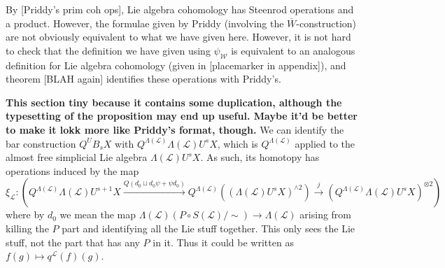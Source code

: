 \documentclass[11pt]{amsart}
\theoremstyle{plain}
\theoremstyle{definition}
\renewcommand{\to}{\longrightarrow}
\newcommand{\scrL}{\mathscr{L}}
\newcommand{\calW}{\mathcal{W}}
\theoremstyle{plain}
\newcommand{\LieOperad}{{\scrL}}
\begin{document}
\begin{Cohomology operations for unstable Lie algebras over P}
By [Priddy's prim coh ops], Lie algebra cohomology has Steenrod operations and a product. However, the formulae given by Priddy (involving the $\overline{W}$-construction) are not obviously equivalent to what we have given here. However, it is not hard to check that the definition we have given using $\psi_\calW$ is equivalent to an analogous definition for Lie algebra cohomology (given in [placemarker in appendix]), and theorem [BLAH again] identifies these operations with Priddy's.

{\tiny
\textbf{This section tiny because it contains some duplication, although the typesetting of the proposition may end up useful. Maybe it'd be better to make it lokk more like Priddy's format, though.} We can identify the bar construction $Q^UB_sX$ with
$Q^{\Lambda(\LieOperad)}\Lambda(\LieOperad)U^sX$,
which is $Q^{\Lambda(\LieOperad)}$ applied to the almost free simplicial Lie algebra $\Lambda(\LieOperad)U^sX$. As such, its homotopy has operations induced by the map
\[\xi_\LieOperad:\left(Q^{\Lambda(\LieOperad)}\Lambda(\LieOperad)U^{s+1}X
\overset{Q(d_0\sqcup d_0\psi+\psi d_0)}{\to}
Q^{\Lambda(\LieOperad)}((\Lambda(\LieOperad)U^sX)^{\wedge2})\overset{j}{\to}
(Q^{\Lambda(\LieOperad)}\Lambda(\LieOperad)U^sX)^{\otimes2}\right)\]
where by $d_0$ we mean the map $\Lambda(\LieOperad)(P\circ S(\LieOperad)/\sim)\to \Lambda(\LieOperad)$ arising from killing the $P$ part and identifying all the Lie stuff together. This only sees the Lie stuff, not the part that has any $P$ in it. Thus it could be written as $f(g)\mapsto q^\LieOperad(f)(g)$.

}
\end{Cohomology operations for unstable Lie algebras over P}
\end{document}
